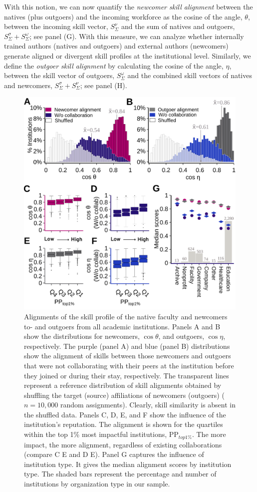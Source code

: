 \documentclass[draft,final]{vutinfth} %
\begin{document}
With this notion, we can now quantify the \emph{newcomer skill alignment} between the natives (plus outgoers) and the incoming workforce as the cosine of the angle, $\theta$, between the incoming skill vector, $S^{\nu}_{\Sigma}$ and the sum of natives and outgoers, $S^{\sigma}_{\Sigma}+S^{\omega}_{\Sigma}$; see panel (G). With this measure, we can analyze whether internally trained authors (natives and outgoers) and external authors (newcomers) generate aligned or divergent skill profiles at the institutional level. Similarly, we define the \emph{outgoer skill alignment} by calculating the cosine of the angle, $\eta$,  between the skill vector of outgoers, $S^{\omega}_{\Sigma}$ and the combined skill vectors of natives and newcomers, $S^{\sigma}_{\Sigma} + S^{\nu}_{\Sigma}$; see panel (H). 

\begin{figure} [t] %
  \centering
  \includegraphics[width=0.7\linewidth]{figures_alignment/figure2abcdefg_new.png}
  \caption{Alignments of the skill profile of the native faculty and newcomers to- and outgoers from all academic institutions. Panels A and B show the distributions for newcomers, $\cos{\theta}$, and outgoers, $\cos{\eta}$, respectively. 
  The purple (panel A) and blue (panel B) distributions show the alignment of skills between those newcomers and outgoers that were not collaborating with their peers at the institution before they joined or during their stay, respectively. The transparent lines represent a reference distribution of skill alignments obtained by shuffling the target (source) affiliations of newcomers (outgoers) ($n=10,000$ random assignments). Clearly, skill similarity is absent in the shuffled data. Panels C, D, E, and F show the influence of the institution's reputation. The alignment is shown for the quartiles within the top 1\% most impactful institutions, {PP}$_{{top}1\%}$. The more impact, the more alignment, regardless of existing collaborations (compare C E and D E). Panel G captures the influence of institution type.
  It gives the median alignment scores by institution type. The shaded bars represent the percentage and number of institutions by organization type in our sample.~\label{fig2:figure2abcdefg_new.png}}
\end{figure}
\end{document}
